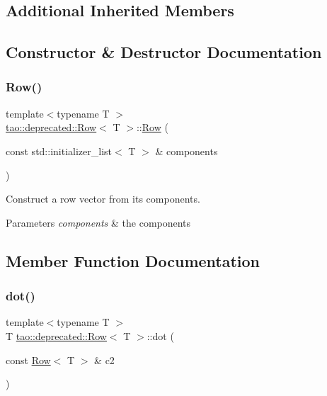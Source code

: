\subsection*{Additional Inherited Members}


\subsection{Constructor \& Destructor Documentation}
\mbox{\label{classtao_1_1deprecated_1_1_row_a4666537e6b41ef3af827ccbe672d25a2}} 
\subsubsection{\texorpdfstring{Row()}{Row()}}
{\footnotesize\ttfamily template$<$typename T $>$ \\
\mbox{\hyperlink{classtao_1_1deprecated_1_1_row}{tao\+::deprecated\+::\+Row}}$<$ T $>$\+::\mbox{\hyperlink{classtao_1_1deprecated_1_1_row}{Row}} (\begin{DoxyParamCaption}\item[{const std\+::initializer\+\_\+list$<$ T $>$ \&}]{components }\end{DoxyParamCaption})}



Construct a row vector from its components. 


\begin{DoxyParams}{Parameters}
{\em components} & the components \\
\hline
\end{DoxyParams}


\subsection{Member Function Documentation}
\mbox{\label{classtao_1_1deprecated_1_1_row_a8f58fe81edb3a35cf715760ac676cd40}} 
\subsubsection{\texorpdfstring{dot()}{dot()}}
{\footnotesize\ttfamily template$<$typename T $>$ \\
T \mbox{\hyperlink{classtao_1_1deprecated_1_1_row}{tao\+::deprecated\+::\+Row}}$<$ T $>$\+::dot (\begin{DoxyParamCaption}\item[{const \mbox{\hyperlink{classtao_1_1deprecated_1_1_row}{Row}}$<$ T $>$ \&}]{c2 }\end{DoxyParamCaption})}




